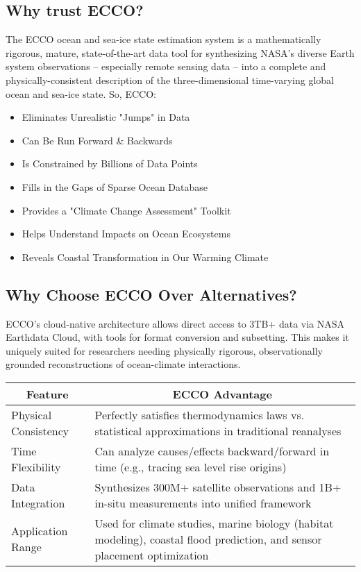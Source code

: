 \subsection{Why trust ECCO?}
\par\vspace{0.25cm}
The ECCO ocean and sea-ice state estimation system is a mathematically rigorous, mature, state-of-the-art data tool for synthesizing NASA's diverse Earth system observations – especially remote sensing data – into a complete and physically-consistent description of the three-dimensional time-varying global ocean and sea-ice state.
\vspace{0.25cm}
So, ECCO:
\begin{itemize}
\item Eliminates Unrealistic "Jumps" in Data
\item Can Be Run Forward \& Backwards
\item Is Constrained by Billions of Data Points
\item Fills in the Gaps of Sparse Ocean Database
\item Provides a "Climate Change Assessment" Toolkit
\item Helps Understand Impacts on Ocean Ecosystems
\item Reveals Coastal Transformation in Our Warming Climate
\end{itemize}

\subsection{Why Choose ECCO Over Alternatives?}
\par\vspace{0.25cm}
ECCO's cloud-native architecture allows direct access to 3TB+ data via NASA Earthdata Cloud, with tools for format conversion and subsetting. This makes it uniquely suited for researchers needing physically rigorous, observationally grounded reconstructions of ocean-climate interactions.
\vspace{0.25cm}

\begin{center}
\begin{tabular}{m{} m{}}
    \multicolumn{1}{c}{\textbf{Feature}} & \multicolumn{1}{c}{\textbf{ECCO Advantage}} \\ \hline
    Physical Consistency & Perfectly satisfies thermodynamics laws vs. statistical approximations in traditional reanalyses \\ \hline 
    Time Flexibility & Can analyze causes/effects backward/forward in time (e.g., tracing sea level rise origins) \\ \hline
    Data Integration & Synthesizes 300M+ satellite observations and 1B+ in-situ measurements into unified framework \\ \hline
    Application Range & Used for climate studies, marine biology (habitat modeling), coastal flood prediction, and sensor placement optimization \\ \hline
\end{tabular}
\end{center}

